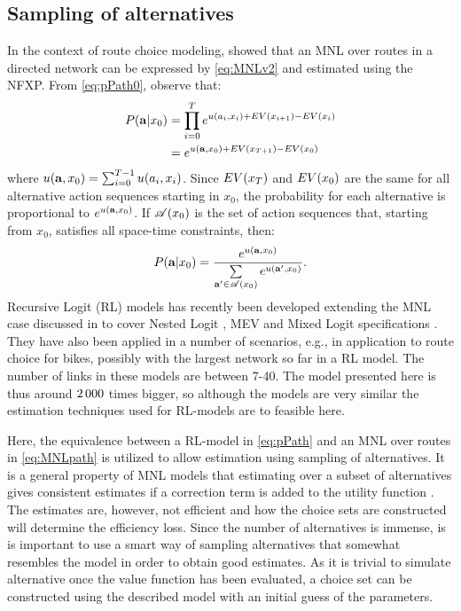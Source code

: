 \subsection{Sampling of alternatives}
In the context of route choice modeling, \citet{fosgerau2013} showed that an MNL over routes in a directed network can be expressed by \eqref{eq:MNLv2} and estimated using the NFXP. From \eqref{eq:pPath0}, observe that: 
\begin{equation}\label{eq:pPath}
\begin{aligned}
P(\ve{a}|x_0) & = \prod_{i=0}^{T} e^{u(a_i,x_i) + \eutil(x_{i+1})-\eutil(x_i)} \\
& = e^{u(\ve{a},x_0) + \eutil(x_{T+1})-\eutil(x_0)}
\end{aligned}
\end{equation}
where $u({\bf a},x_0) = \sum_{i=0}^{T-1} u(a_i,x_i)$. Since $EV(x_{T})$ and $EV(x_0)$ are the same for all alternative action sequences starting in $x_0$, the probability for each alternative is proportional to $e^{u({\bf a},x_0) }$. If $\mathscr{A}(x_0)$ is the set of action sequences that, starting from $x_0$, satisfies all space-time constraints, then:
\begin{equation} \label{eq:MNLpath}
P(\ve{a}|x_0) = \frac{e^{u(\ve{a},x_0)}}{\sum\limits_{\ve{a'} \in \Agood(x_0)}e^{u(\ve{a'},x_0)}}.
\end{equation}
Recursive Logit (RL) models has recently been developed extending the MNL case discussed in \citet{fosgerau2013} to cover Nested Logit \citep{mai2015}, MEV \citep{mai2016method} and Mixed Logit specifications \citep{mai2016decomposition}. They have also been applied in a number of scenarios, e.g., in \cite{zimmermann2017bike}  application to route choice for bikes, possibly with the largest network so far in a RL model. The number of links in these models are between 7-40. The model presented here is thus around $2\, 000$ times bigger, so although the models are very similar the estimation techniques used for RL-models are to feasible here. 

Here, the equivalence between a RL-model in \eqref{eq:pPath} and an MNL over routes in \eqref{eq:MNLpath} is utilized to allow estimation using sampling of alternatives. 
It is a general property of MNL models that estimating over a subset of alternatives gives consistent estimates if a correction term is added to the utility function \citep{mcfadden78}. The estimates are, however, not efficient and how the choice sets are constructed will determine the efficiency loss. Since the number of alternatives is immense, is is important to use a smart way of sampling alternatives that somewhat resembles the model in order to obtain good estimates. As it is trivial to simulate alternative once the value function has been evaluated, a choice set can be constructed using the described model with an initial guess of the parameters.

